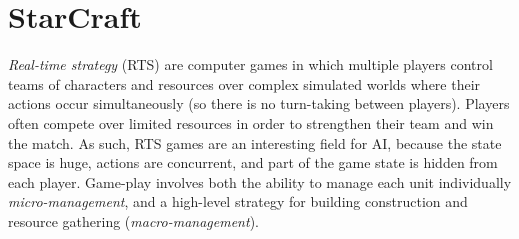 \chapter{StarCraft}
\label{chapter:sc}

\emph{Real-time strategy} (RTS) are computer games in which multiple players control teams of characters and resources over complex simulated worlds where their actions occur simultaneously (so there is no turn-taking between players). 
Players often compete over limited resources in order to strengthen their team and win the match. 
As such, RTS games are an interesting field for AI, because the state space is huge, actions are concurrent, and part of the game state is hidden from each player. 
Game-play involves both the ability to manage each unit individually \textit{micro-management}, and a high-level strategy for building construction and resource gathering (\textit{macro-management}). 

